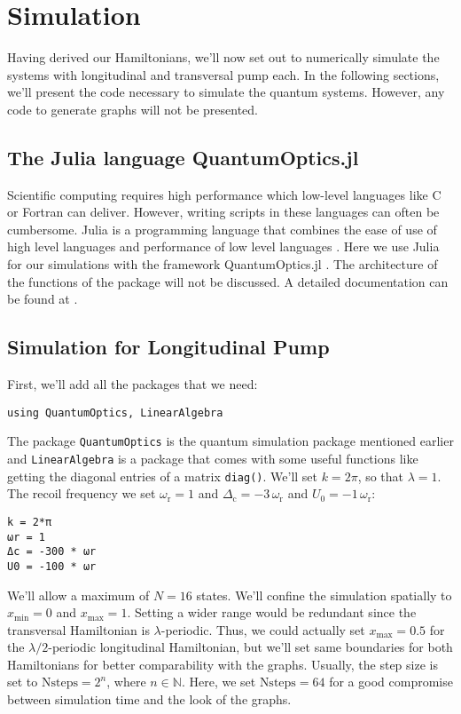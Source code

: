 \section{Simulation}
Having derived our Hamiltonians, we'll now set out to numerically simulate the systems with longitudinal and transversal pump each. In the following sections, we'll present the code necessary to simulate the quantum systems. However, any code to generate graphs will not be presented.

\subsection{The Julia language QuantumOptics.jl}
Scientific computing requires high performance which low-level languages like C or Fortran can deliver. However, writing scripts in these languages can often be cumbersome. Julia is a programming language that combines the ease of use of high level languages and performance of low level languages \cite{julialang}. Here we use Julia for our simulations with the framework QuantumOptics.jl \cite{qojulia}. The architecture of the functions of the package will not be discussed. A detailed documentation can be found at \cite{documentation}.

\subsection{Simulation for Longitudinal Pump}
First, we'll add all the packages that we need:

\begin{lstlisting}
using QuantumOptics, LinearAlgebra
\end{lstlisting}The package \texttt{QuantumOptics} is the quantum simulation package mentioned earlier and \texttt{LinearAlgebra} is a package that comes with some useful functions like getting the diagonal entries of a matrix \texttt{diag()}. We'll set $k=2\pi$, so that $\lambda=1$. The recoil frequency we set $\omega_\text{r} = 1$ and $\Delta_\text{c} = -3 \, \omega_\text{r}$ and $U_0 = -1 \, \omega_\text{r}$:

\begin{lstlisting}
k = 2*π
ωr = 1
Δc = -300 * ωr
U0 = -100 * ωr
\end{lstlisting}We'll allow a maximum of $N = 16$ states. We'll confine the simulation spatially to $x_\text{min} = 0$ and $x_\text{max} = 1$. Setting a wider range would be redundant since the transversal Hamiltonian is $\lambda$-periodic. Thus, we could actually set $x_\text{max} = 0.5$ for the $\lambda/2$-periodic longitudinal Hamiltonian, but we'll set same boundaries for both Hamiltonians for better comparability with the graphs. Usually, the step size is set to $\text{Nsteps} = 2^n$, where $n \in \mathbb{N}$. Here, we set $\text{Nsteps} = 64$ for a good compromise between simulation time and the look of the graphs.


